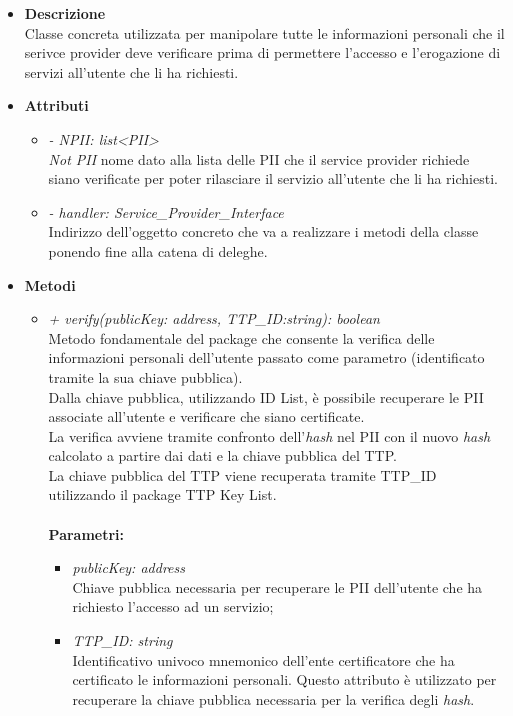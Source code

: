 \begin{itemize}
	\item \textbf{Descrizione}\\
	Classe concreta utilizzata per manipolare tutte le informazioni personali che il serivce provider deve verificare prima di permettere l'accesso e l'erogazione di servizi all'utente che li ha richiesti.
	\item \textbf{Attributi}
	\begin{itemize}
		\item \textit{- NPII: list<PII>}\\
		\textit{Not PII} nome dato alla lista delle \gls{PII} che il service provider richiede siano verificate per poter rilasciare il servizio all'utente che li ha richiesti.
		\item \textit{- handler: Service\_Provider\_Interface}\\
		Indirizzo dell'oggetto concreto che va a realizzare i metodi della classe ponendo fine alla catena di deleghe.
	\end{itemize}
	\item \textbf{Metodi}
	\begin{itemize}
		\item \textit{+ verify(publicKey: address, TTP\_ID:string): boolean}\\
		Metodo fondamentale del package che consente la verifica delle informazioni personali dell'utente passato come parametro (identificato tramite la sua chiave pubblica).\\
		Dalla chiave pubblica, utilizzando ID List, è possibile recuperare le \gls{PII} associate all'utente e verificare che siano certificate.\\
		La verifica avviene tramite confronto dell'\textit{hash} nel \gls{PII} con il nuovo \textit{hash} calcolato a partire dai dati e la chiave pubblica del \gls{TTP}.\\
		La chiave pubblica del \gls{TTP} viene recuperata tramite TTP\_ID utilizzando il package TTP Key List.\\\\
		\textbf{Parametri:}
		\begin{itemize}
			\item \textit{publicKey: address}\\
			Chiave pubblica necessaria per recuperare le \gls{PII} dell'utente che ha richiesto l'accesso ad un servizio;
			\item \textit{TTP\_ID: string}\\
			Identificativo univoco mnemonico dell'ente certificatore che ha certificato le informazioni personali. Questo attributo è utilizzato per recuperare la chiave pubblica necessaria per la verifica degli \textit{hash}.

\end{itemize}
\end{itemize}
\end{itemize}

